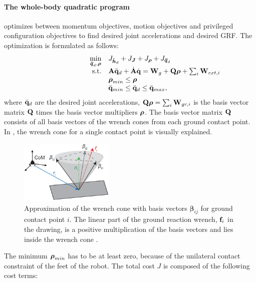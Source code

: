 \paragraph{The whole-body quadratic program} \cite{koolen2016design} optimizes between momentum objectives, motion objectives and privileged configuration objectives to find desired joint accelerations and desired \ac{GRF}. The optimization is formulated as follows:
\begin{equation}
\begin{array}{rlcl}
\displaystyle \min_{\bs{\ddot{q}}_d,\bs{\rho}} & \multicolumn{3}{l}{J_{\bs{\dot{h}}_d} + J_{\bs{J}} + J_{\bs{\rho}} + J_{\bs{\ddot{q}}_d} } \\%
\textrm{s.t.} & \matr{A}\ddqjntd + \dot{\matr{A}}\dqjnt = \matr{W}_g + \matr{Q}\bs{\rho}+\sum_i\matr{W}_{ext,i}\\
&\displaystyle \bs{\rho}_{min} \leq \bs{\rho}\\
&\ddot{\qjnt}_{min} \leq \ddqjntd \leq \ddot{\qjnt}_{max},
\end{array}
\end{equation}
where $\ddot{\mathbf{q}}_d$ are the desired joint accelerations, $\mathbf{Q}\boldsymbol{\rho} = \sum_i\mathbf{W}_{gr,i}$ is the basis vector matrix $\mathbf{Q}$ times the basis vector multipliers $\boldsymbol{\rho}$. The basis vector matrix $\mathbf{Q}$ consists of all basis vectors of the wrench cones from each ground contact point. In , the wrench cone for a single contact point is visually explained.
\begin{figure}[h]
\centering
\includegraphics[width=0.4\textwidth]{STYLESTUFF/wrenchcone.png}
\caption{Approximation of the wrench cone with basis vectors $\boldsymbol{\beta}_{ij}$ for ground contact point $i$. The linear part of the ground reaction wrench, $\mathbf{f}_i$ in the drawing, is a positive multiplication of the basis vectors and lies inside the wrench cone \cite{koolen2016design}. }
\label{fig:wrenchcone}
\end{figure}
The minimum $\boldsymbol{\rho}_{min}$ has to be at least zero, because of the unilateral contact constraint of the feet of the robot. The total cost $J$ is composed of the following cost terms:
